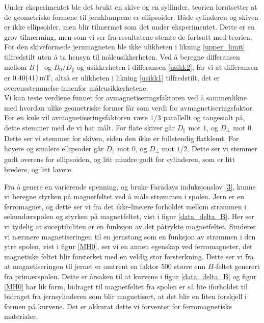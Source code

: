 \documentclass[%
 reprint,
 amsmath,amssymb,
 aps,
 norsk,
]{revtex4-1}
\begin{document}
Under eksperimentet ble det brukt en skive og en syllinder, teorien forutsetter at de geometriske formene til jernklumpene er ellipsoider. Både sylinderen og skiven er ikke ellipsoider, men blir tilnærmet som det under eksperimentet. Dette er en grov tilnærming, men som vi ser fra resultatene stemte de fortsatt med teorien. For den skiveformede jernmagneten ble ikke ulikheten i likning \eqref{upper_limit} tilfredstilt uten å ta hensyn til måleusikkerheten. Ved å beregne differansen mellom $B\parallel$ og $B_0/D_{\parallel}$ og usikkerheten i differansen \eqref{usikk2}, får vi at differansen er $\SI{0.4\pm0.41}{\milli\tesla}$, altså er ulikheten i likning \eqref{usikk1} tilfredstilt, det er overensstemmelse innenfor måleusikkerhetene.\\
Vi kan teste verdiene funnet for avmagnetiseringsfaktoren ved å sammenlikne med hvordan ulike geometriske former får som verdi for avmagnetiseringsfaktor. For en kule vil avmagnetiseringsfaktoren være $1/3$ parallellt og tangesialt på, dette stemmer med de vi har målt. For flate skiver går $D_{\parallel}$ mot $1$, og $D_{\perp}$ mot $0$. Dette ser vi stemmer for skiven, siden den ikke er fullstendig flatklemt. For høyere og smalere ellipsoder går $D_{\parallel}$ mot $0$, og $D_{\perp}$ mot $1/2$. Dette ser vi stemmer godt overens for ellipsoiden, og litt mindre godt for sylinderen, som er litt bredere, og litt lavere.\par
Fra å genere en varierende spenning, og bruke Faradays induksjonslov \eqref{3}, kunne vi beregne styrken på magnetfeltet ved å måle strømmen i spolen. Jern er en ferromagnet, og dette ser vi fra det ikke-lineære forholdet mellom strømmen i sekundærspolen og styrken på magnetfeltet, vist i figur \vref{data_delta_B}. Her ser vi tydelig at suceptibiliten er en funksjon av det påtrykte magnetfeltet. Studerer vi nærmere magnetiseringen til en jernstang som en funksjon av strømmen i den ytre spolen, vist i figur \vref{MH0}, ser vi en annen egenskap ved ferromagneter, det magnetiske feltet blir forsterket med en veldig stor forsterkning. Dette ser vi fra at magnetiseringen til jernet er omtrent en faktor $500$ større enn $H$-feltet generert fra primærspolen. Dette er årsaken til at kurvene i figur \vref{data_delta_B} og figur \vref{MH0} har lik form, bidraget til magnetfeltet fra spolen er så lite iforholdet til bidraget fra jernsylinderen som blir magnetisert, at det blir en liten forskjell i formen på kurvene. Det er akkurat dette vi forventer for ferromagnetiske materialer.
\end{document}
